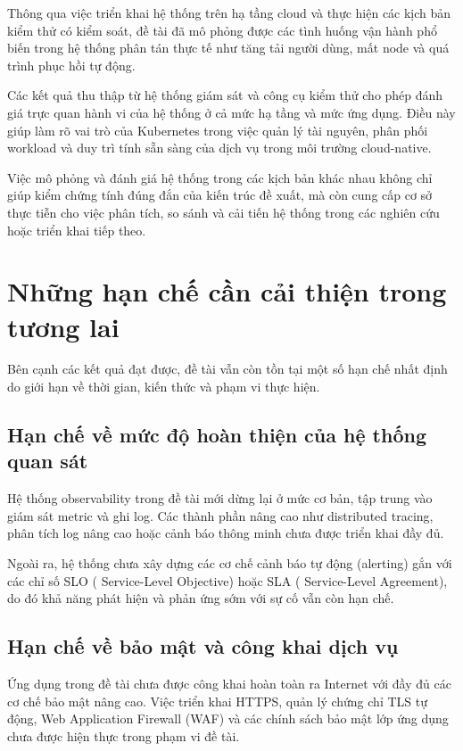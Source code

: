Thông qua việc triển khai hệ thống trên hạ tầng cloud và thực hiện các kịch bản
kiểm thử có kiểm soát, đề tài đã mô phỏng được các tình huống vận hành phổ biến
trong hệ thống phân tán thực tế như tăng tải người dùng, mất node và quá trình
phục hồi tự động.

Các kết quả thu thập từ hệ thống giám sát và công cụ kiểm thử cho phép đánh giá
trực quan hành vi của hệ thống ở cả mức hạ tầng và mức ứng dụng. Điều này giúp
làm rõ vai trò của Kubernetes trong việc quản lý tài nguyên, phân phối workload
và duy trì tính sẵn sàng của dịch vụ trong môi trường cloud-native.

Việc mô phỏng và đánh giá hệ thống trong các kịch bản khác nhau không chỉ giúp
kiểm chứng tính đúng đắn của kiến trúc đề xuất, mà còn cung cấp cơ sở thực tiễn
cho việc phân tích, so sánh và cải tiến hệ thống trong các nghiên cứu hoặc triển
khai tiếp theo.


\section{Những hạn chế cần cải thiện trong tương lai}
\label{sec:chap3-limitations}

Bên cạnh các kết quả đạt được, đề tài vẫn còn tồn tại một số hạn chế nhất định do
giới hạn về thời gian, kiến thức và phạm vi thực hiện.

\subsection{Hạn chế về mức độ hoàn thiện của hệ thống quan sát}

Hệ thống observability trong đề tài mới dừng lại ở mức cơ bản, tập trung vào giám
sát metric và ghi log. Các thành phần nâng cao như distributed tracing, phân tích
log nâng cao hoặc cảnh báo thông minh chưa được triển khai đầy đủ.

Ngoài ra, hệ thống chưa xây dựng các cơ chế cảnh báo tự động (alerting) gắn với
các chỉ số SLO ( Service-Level Objective) hoặc SLA ( Service-Level Agreement), do đó khả năng phát hiện và phản ứng sớm với sự cố vẫn còn
hạn chế.

\subsection{Hạn chế về bảo mật và công khai dịch vụ}

Ứng dụng trong đề tài chưa được công khai hoàn toàn ra Internet với đầy đủ các cơ
chế bảo mật nâng cao. Việc triển khai HTTPS, quản lý chứng chỉ TLS tự động, Web
Application Firewall (WAF) và các chính sách bảo mật lớp ứng dụng chưa được hiện
thực trong phạm vi đề tài.

